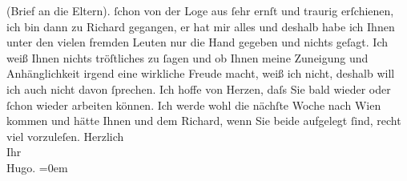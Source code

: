 \begin{ledgroupsized}[t]{13cm}
{{{                  (Brief an die Eltern).}}}\label{K_L00728_1h} ſchon von der Loge aus ſehr ernſt und traurig erſchienen,
               ich bin dann zu Richard gegangen, er hat mir
               alles \label{K_L00728_2v}\label{K_L00728_2h} und deshalb habe ich Ihnen
               unter den vielen fremden Leuten nur die Hand gegeben und nichts geſagt. Ich weiß
               Ihnen {\pb}nichts tröſtliches zu ſagen
               und ob Ihnen meine Zuneigung und Anhänglichkeit irgend eine wirkliche Freude macht,
               weiß ich nicht, deshalb will ich auch nicht davon ſprechen. Ich hoffe von Herzen,
               daſs Sie bald wieder oder ſchon wieder arbeiten können. Ich werde {\pb}wohl die nächſte Woche nach Wien kommen und hätte Ihnen und dem Richard, wenn Sie beide aufgelegt ſind, recht
               viel vorzuleſen.\pend
           \pstart
           Herzlich{\\[\baselineskip]}Ihr{\\[\baselineskip]}\spacefill\mbox{Hugo.}\pend
           \leftskip=0em{}
         
         \endnumbering{}\end{ledgroupsized}  \newcommand{\dateiname}{L00728}\newcommand{\titel}{Hugo von Hofmannsthal an Arthur Schnitzler, 3. 10. [1897]}\newcommand{\editorInnen}{Martin Anton Müller und Gerd-Hermann Susen}
      